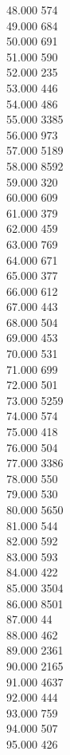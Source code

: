 { 48.000	574 \\
 49.000	684 \\
 50.000	691 \\
 51.000	590 \\
 52.000	235 \\
 53.000	446 \\
 54.000	486 \\
 55.000	3385 \\
 56.000	973 \\
 57.000	5189 \\
 58.000	8592 \\
 59.000	320 \\
 60.000	609 \\
 61.000	379 \\
 62.000	459 \\
 63.000	769 \\
 64.000	671 \\
 65.000	377 \\
 66.000	612 \\
 67.000	443 \\
 68.000	504 \\
 69.000	453 \\
 70.000	531 \\
 71.000	699 \\
 72.000	501 \\
 73.000	5259 \\
 74.000	574 \\
 75.000	418 \\
 76.000	504 \\
 77.000	3386 \\
 78.000	550 \\
 79.000	530 \\
 80.000	5650 \\
 81.000	544 \\
 82.000	592 \\
 83.000	593 \\
 84.000	422 \\
 85.000	3504 \\
 86.000	8501 \\
 87.000	44 \\
 88.000	462 \\
 89.000	2361 \\
 90.000	2165 \\
 91.000	4637 \\
 92.000	444 \\
 93.000	759 \\
 94.000	507 \\
 95.000	426 \\
}
